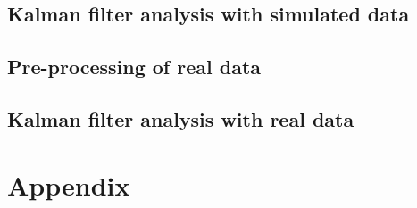\documentclass[12pt, a4paper]{article} %
\begin{document}
\setlength{\parskip}{0mm}

\setlength{\parskip}{4mm}

\subsection{Kalman filter analysis with simulated data}

\setlength{\parskip}{0mm}

\setlength{\parskip}{4mm}

\subsection{Pre-processing of real data}

\setlength{\parskip}{0mm}

\setlength{\parskip}{4mm}

\subsection{Kalman filter analysis with real data}

\setlength{\parskip}{0mm}

\setlength{\parskip}{4mm}

\newpage

\newpage


\pagestyle{empty}



\section{Appendix}
\end{document}
